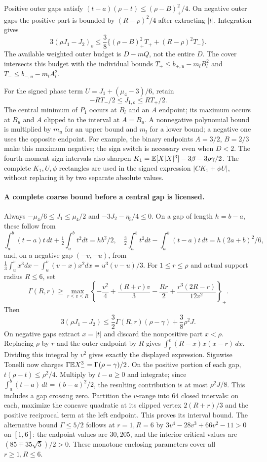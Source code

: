 Positive outer gaps satisfy
$(t-a)(\rho-t)\le(\rho-B)_+^2/4$. On negative outer gaps the positive
part is bounded by $(R-\rho)^2/4$ after extracting $|t|$.
Integration gives
\[
 3(\rho J_1-J_2)_o
 \le\frac38\{(\rho-B)_+^2T_++(R-\rho)^2T_-\}.
\]
The available weighted outer budget is $D-mQ$, not the entire $D$.
The cover intersects this budget with the individual bounds
$T_+\le b_{+,u}-m_lB_l^2$ and $T_-\le b_{-,u}-m_lA_l^2$.

For the signed phase term $U=J_1+(\mu_4-3)/6$, retain
\[
 -RT_-/2\le J_{1,o}\le RT_+/2.
\]
The central minimum of $P_1$ occurs at $B_l$ and an $A$ endpoint;
its maximum occurs at $B_u$ and $A$ clipped to the interval at $A=B_u$.
A nonnegative polynomial bound is multiplied by $m_u$ for an upper
bound and $m_l$ for a lower bound; a negative one uses the opposite
endpoint. For example, the binary endpoints $A=3/2$, $B=2/3$ make this
maximum negative; the sign switch is necessary even when $D<2$.
The fourth-moment sign intervals also sharpen
$K_1=\mathbb E[X|X|^3]-3\beta-3\rho\gamma/2$.
The complete $K_1,U,\phi$ rectangles are used in the signed expression
$|CK_1+\phi U|$, without replacing it by two separate absolute values.


\paragraph{A complete coarse bound before a central gap is licensed.}
Always $-\mu_4/6\le J_1\le\mu_4/2$ and
$-3J_2-\eta_5/4\le0$. On a gap of length $h=b-a$, these follow from
\[
 \int_a^b(t-a)t\,dt+\tfrac12\int_a^bt^2dt=hb^2/2,\quad
 \tfrac32\int_a^bt^2dt-\int_a^b(t-a)t\,dt=h(2a+b)^2/6,
\]
and, on a negative gap $(-v,-u)$, from
$\tfrac13\int_u^v x^3dx-\int_u^v(v-x)x^2dx=u^3(v-u)/3$.
For $1\le r\le\rho$ and actual support radius $R\le6$, set
\[
 \Gamma(R,r)\ge\max_{r\le v\le R}
 \left\{-\frac{v^2}4+\frac{(R+r)v}3-\frac{Rr}2+
                      \frac{r^3(2R-r)}{12v^2}\right\}_+.
\]
Then
\[
 3(\rho J_1-J_2)\le\frac32\Gamma(R,r)(\rho-\gamma)
                              +\frac38\rho^2J.
\]
On negative gaps extract $x=|t|$ and discard the nonpositive part
$x<\rho$. Replacing $\rho$ by $r$ and the outer endpoint by $R$
gives $\int_r^v(R-x)x(x-r)\,dx$. Dividing this integral by $v^2$
gives exactly the displayed expression. Signwise Tonelli now charges
$\Gamma\mathbb E X_-^3=\Gamma(\rho-\gamma)/2$.
On the positive portion of each gap, $t(\rho-t)\le\rho^2/4$.
Multiply by $t-a\ge0$ and integrate; since
$\int_a^b(t-a)\,dt=(b-a)^2/2$, the resulting contribution is
at most $\rho^2J/8$. This includes a gap crossing zero.
Partition the $v$-range into 64 closed intervals: on each, maximize the
concave quadratic at its clipped vertex $2(R+r)/3$ and the positive
reciprocal term at the left endpoint. This proves its interval bound.
The alternative bound $\Gamma\le5/2$ follows at $r=1,R=6$ by
$3v^4-28v^3+66v^2-11>0$ on $[1,6]$: the endpoint values are $30,205$,
and the interior critical values are $(85\mp35\sqrt5)/2>0$.
These monotone enclosing parameters cover all $r\ge1,R\le6$.
